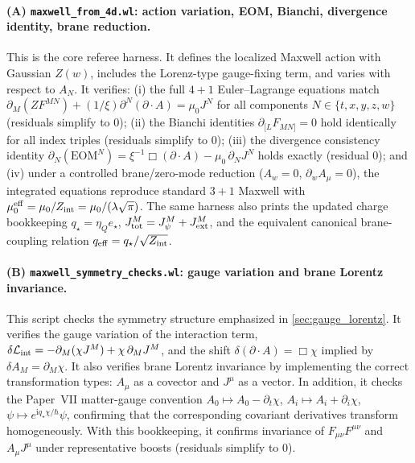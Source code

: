 \documentclass[11pt]{article}
\newcommand{\ii}{\mathrm i}
\newcommand{\A}{A}
\newcommand{\F}{F}
\newcommand{\J}{J}
\newcommand{\Z}{Z}
\newcommand{\lam}{\lambda}      %
\newcommand{\Zint}{Z_{\rm int}} %
\newcommand{\etaQ}{\eta_Q}
\newcommand{\estar}{e_\star}
\newcommand{\qstar}{q_\star}
\newcommand{\qeff}{q_{\rm eff}}
\newcommand{\Jpsi}{J_\psi}
\newcommand{\Jext}{J_{\rm ext}}
\newcommand{\Jtot}{J_{\rm tot}}
\newcommand{\muo}{\mu_0}
\newcommand{\mueff}{\mu_0^{\rm eff}}
\newcommand{\xigf}{\xi}
\begin{document}
\paragraph{(A) \texttt{maxwell\_from\_4d.wl}: action variation, EOM, Bianchi, divergence identity, brane reduction.}
This is the core referee harness. It defines the localized Maxwell action with
Gaussian \(\Z(w)\), includes the Lorenz-type gauge-fixing term, and varies with
respect to \(\A_N\). It verifies:
(i) the full \(4+1\) Euler--Lagrange equations match
\(\partial_M(\Z\F^{MN})+(1/\xigf)\partial^N(\partial\!\cdot\!\A)=\muo\J^N\) for all
components \(N\in\{t,x,y,z,w\}\) (residuals simplify to \(0\));
(ii) the Bianchi identities \(\partial_{[L}\F_{MN]}=0\) hold identically for all
index triples (residuals simplify to \(0\));
(iii) the divergence consistency identity
\(\partial_N(\mathrm{EOM}^N)=\xigf^{-1}\Box(\partial\!\cdot\!\A)-\muo\,\partial_N\J^N\)
holds exactly (residual \(0\));
and (iv) under a controlled brane/zero-mode reduction (\(\A_w=0\),
\(\partial_w\A_\mu=0\)), the integrated equations reproduce standard \(3+1\)
Maxwell with \(\mueff=\muo/\Zint=\muo/(\lam\sqrt{\pi})\). The same harness also
prints the updated charge bookkeeping
\(\qstar=\etaQ\estar\), \(\Jtot^M=\Jpsi^M+\Jext^M\), and the equivalent
canonical brane-coupling relation \(\qeff=\qstar/\sqrt{\Zint}\).

\paragraph{(B) \texttt{maxwell\_symmetry\_checks.wl}: gauge variation and brane Lorentz invariance.}
This script checks the symmetry structure emphasized in
\cref{sec:gauge_lorentz}. It verifies the gauge variation of the interaction term,
\(\delta\mathcal L_{\rm int}=-\partial_M(\chi\J^M)+\chi\,\partial_M\J^M\), and the
shift \(\delta(\partial\!\cdot\!\A)=\Box\chi\) implied by \(\delta \A_M=\partial_M\chi\).
It also verifies brane Lorentz invariance by implementing the correct
transformation types: \(\A_\mu\) as a covector and \(\J^\mu\) as a vector. In
addition, it checks the Paper~VII matter-gauge convention
\(A_0\mapsto A_0-\partial_t\chi\), \(A_i\mapsto A_i+\partial_i\chi\),
\(\psi\mapsto e^{\ii\qstar\chi/\hbar}\psi\), confirming that the corresponding
covariant derivatives transform homogeneously. With this bookkeeping, it
confirms invariance of \(\F_{\mu\nu}\F^{\mu\nu}\) and \(\A_\mu\J^\mu\) under
representative boosts (residuals simplify to \(0\)).
\end{document}
